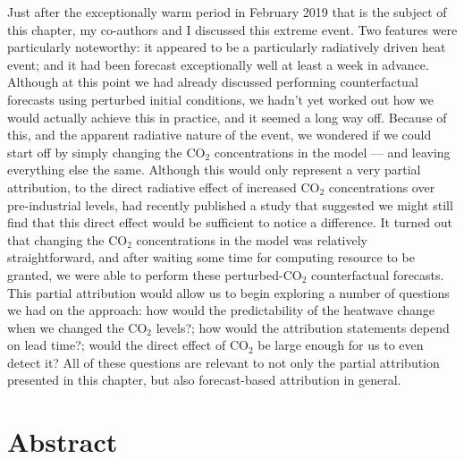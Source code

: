   Just after the exceptionally warm period in February 2019 that is the subject of this chapter, my co-authors and I discussed this extreme event. Two features were particularly noteworthy: it appeared to be a particularly radiatively driven heat event; and it had been forecast exceptionally well at least a week in advance. Although at this point we had already discussed performing counterfactual forecasts using perturbed initial conditions, we hadn't yet worked out how we would actually achieve this in practice, and it seemed a long way off. Because of this, and the apparent radiative nature of the event, we wondered if we could start off by simply changing the CO$_2$ concentrations in the model --- and leaving everything else the same. Although this would only represent a very partial attribution, to the direct radiative effect of increased CO$_2$ concentrations over pre-industrial levels, \citet{baker_higher_2018} had recently published a study that suggested we might still find that this direct effect would be sufficient to notice a difference. It turned out that changing the CO$_2$ concentrations in the model was relatively straightforward, and after waiting some time for computing resource to be granted, we were able to perform these perturbed-CO$_2$ counterfactual forecasts. This partial attribution would allow us to begin exploring a number of questions we had on the approach: how would the predictability of the heatwave change when we changed the CO$_2$ levels?; how would the attribution statements depend on lead time?; would the direct effect of CO$_2$ be large enough for us to even detect it? All of these questions are relevant to not only the partial attribution presented in this chapter, but also forecast-based attribution in general.

\section{Abstract}\label{ch3:abstract}

